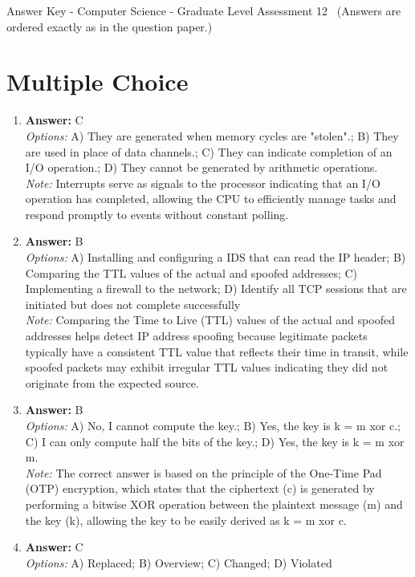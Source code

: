 \documentclass[12pt]{article}
\begin{document}
\begin{center}
Answer Key - Computer Science - Graduate Level Assessment 12 \
\small (Answers are ordered exactly as in the question paper.)
\end{center}

\section*{Multiple Choice}
\begin{enumerate}[label=\arabic*.]
\item \textbf{Answer:} C
\\ \textit{Options:} A) They are generated when memory cycles are "stolen".; B) They are used in place of data channels.; C) They can indicate completion of an I/O operation.; D) They cannot be generated by arithmetic operations.
\\ \textit{Note:} Interrupts serve as signals to the processor indicating that an I/O operation has completed, allowing the CPU to efficiently manage tasks and respond promptly to events without constant polling.
\item \textbf{Answer:} B
\\ \textit{Options:} A) Installing and configuring a IDS that can read the IP header; B) Comparing the TTL values of the actual and spoofed addresses; C) Implementing a firewall to the network; D) Identify all TCP sessions that are initiated but does not complete successfully
\\ \textit{Note:} Comparing the Time to Live (TTL) values of the actual and spoofed addresses helps detect IP address spoofing because legitimate packets typically have a consistent TTL value that reflects their time in transit, while spoofed packets may exhibit irregular TTL values indicating they did not originate from the expected source.
\item \textbf{Answer:} B
\\ \textit{Options:} A) No, I cannot compute the key.; B) Yes, the key is k = m xor c.; C) I can only compute half the bits of the key.; D) Yes, the key is k = m xor m.
\\ \textit{Note:} The correct answer is based on the principle of the One-Time Pad (OTP) encryption, which states that the ciphertext (c) is generated by performing a bitwise XOR operation between the plaintext message (m) and the key (k), allowing the key to be easily derived as k = m xor c.
\item \textbf{Answer:} C
\\ \textit{Options:} A) Replaced; B) Overview; C) Changed; D) Violated

\end{enumerate}
\end{document}

